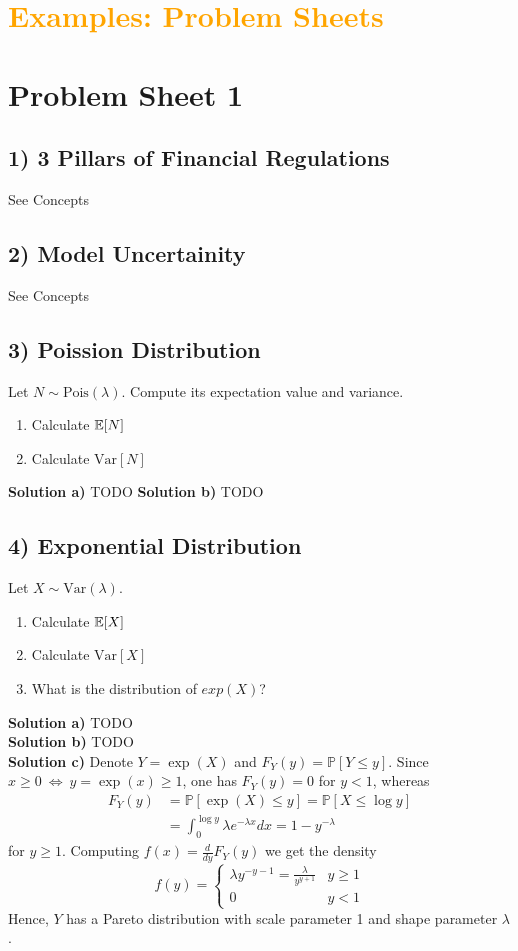\section*{\textcolor{orange}{Examples: Problem Sheets}}
%
%
\section*{Problem Sheet 1}

%
%
\subsection*{1) 3 Pillars of Financial Regulations} See Concepts

%
%
\subsection*{2) Model Uncertainity} See Concepts

%
%
\subsection*{3) Poission Distribution}
Let $N \sim \text{Pois}(\lambda)$. Compute its expectation value and variance.
\begin{enumerate}[label=(\alph*)]
    \item Calculate $\mathbb{E}[N]$
    \item Calculate $\text{Var}[N]$
\end{enumerate}
\textbf{Solution a)} TODO
\textbf{Solution b)} TODO

%
%
\subsection*{4) Exponential Distribution}
Let $X \sim \text{Var}(\lambda)$.
\begin{enumerate}[label=(\alph*)]
    \item Calculate $\mathbb{E}[X]$
    \item Calculate $\text{Var}[X]$
    \item What is the distribution of $exp(X)$?
\end{enumerate}
\textbf{Solution a)} TODO \\
\textbf{Solution b)} TODO \\
\textbf{Solution c)}
Denote $Y = \exp(X)$ and $F_Y(y) =
\mathbb{P}[Y \leq y]$. Since $x \geq 0 \ \Leftrightarrow \ y = \exp(x) \geq 1$,
one has $F_Y(y) = 0$ for $y < 1$, whereas
\begin{align*}
  F_Y(y) &= \mathbb{P}[\exp(X) \leq y] = \mathbb{P}[X \leq \log{y}] \\
  &= \int_0^{\log{y}} \lambda e^{-\lambda x}dx = 1 - y^{-\lambda}
\end{align*}
for $y \geq 1$. Computing $f(x) = \frac{d}{dy} F_Y(y)$ we get the density
\[
  f(y) = \begin{cases}
           \lambda y^{-y - 1} = \frac{\lambda}{y^{y+1}} & y \geq 1 \\
           0 & y < 1
         \end{cases}
\]
Hence, $Y$ has a Pareto distribution with scale parameter 1 and shape parameter
$\lambda$.

